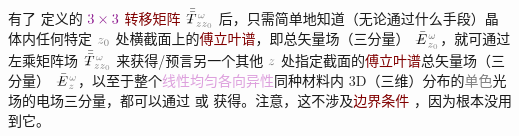 有了  定义的 $\textcolor{Plum}{3 \times 3}$ \textcolor{Maroon}{转移矩阵} $\Xint{\mathcolor{gray}{-}}{30}{\bar{\bar{T}}}^{\;\!\mathcolor{gray}{\omega}}_{\;\! \mathcolor{gray}{z} \mathcolor{gray}{z_0}}$ 后，只需简单地知道（无论通过什么手段）晶体内任何特定 $\mathcolor{gray}{z_0}$ 处横截面上的\textcolor{Maroon}{傅立叶谱}，即\textcolor{PineGreen}{总矢量场}（三分量） $\Xint{\mathcolor{gray}{-}}{25}{\bar{E}}^{\;\!\mathcolor{gray}{\omega}}_{\;\! \mathcolor{gray}{z_0}}$，就可通过左乘矩阵场 $\Xint{\mathcolor{gray}{-}}{30}{\bar{\bar{T}}}^{\;\!\mathcolor{gray}{\omega}}_{\;\! \mathcolor{gray}{z} \mathcolor{gray}{z_0}}$ 来获得/预言另一个其他 $\mathcolor{gray}{z}$ 处指定截面的\textcolor{Maroon}{傅立叶谱}\textcolor{PineGreen}{总矢量场}（三分量） $\Xint{\mathcolor{gray}{-}}{25}{\bar{E}}^{\;\!\mathcolor{gray}{\omega}}_{\;\! \mathcolor{gray}{z}}$，以至于整个\textcolor{Plum}{线性}\textcolor{Plum}{均匀}\textcolor{Plum}{各向异性}同种材料内 3D（三维）分布的\textcolor{gray}{单色}光场的电场三分量，都可以通过  或  获得。注意，这不涉及\textcolor{Maroon}{边界条件} ，因为根本没用到它。

